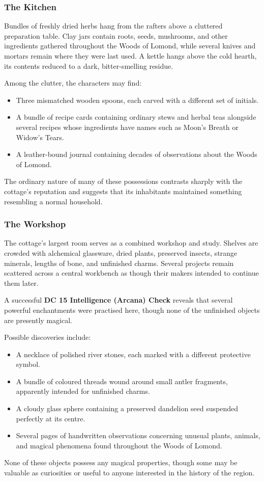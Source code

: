 \subsubsection*{The Kitchen}
{\entryfont Bundles of freshly dried herbs hang from the rafters above a cluttered preparation table. Clay jars contain roots, seeds, mushrooms, and other ingredients gathered throughout the Woods of Lomond, while several knives and mortars remain where they were last used. A kettle hangs above the cold hearth, its contents reduced to a dark, bitter-smelling residue.

Among the clutter, the characters may find:
\begin{itemize}
	\item Three mismatched wooden spoons, each carved with a different set of initials.
	\item A bundle of recipe cards containing ordinary stews and herbal teas alongside several recipes whose ingredients have names such as Moon's Breath or Widow's Tears.
	\item A leather-bound journal containing decades of observations about the Woods of Lomond.
\end{itemize}
\noindent The ordinary nature of many of these possessions contrasts sharply with the cottage's reputation and suggests that its inhabitants maintained something resembling a normal household.}

\subsubsection*{The Workshop}
{\entryfont The cottage's largest room serves as a combined workshop and study. Shelves are crowded with alchemical glassware, dried plants, preserved insects, strange minerals, lengths of bone, and unfinished charms. Several projects remain scattered across a central workbench as though their makers intended to continue them later.

A successful \textbf{DC 15 Intelligence (Arcana) Check} reveals that several powerful enchantments were practised here, though none of the unfinished objects are presently magical.

Possible discoveries include:
\begin{itemize}
	\item A necklace of polished river stones, each marked with a different protective symbol.
	\item A bundle of coloured threads wound around small antler fragments, apparently intended for unfinished charms.
	\item A cloudy glass sphere containing a preserved dandelion seed suspended perfectly at its centre.
	\item Several pages of handwritten observations concerning unusual plants, animals, and magical phenomena found throughout the Woods of Lomond.
\end{itemize}
\noindent None of these objects possess any magical properties, though some may be valuable as curiosities or useful to anyone interested in the history of the region.}

